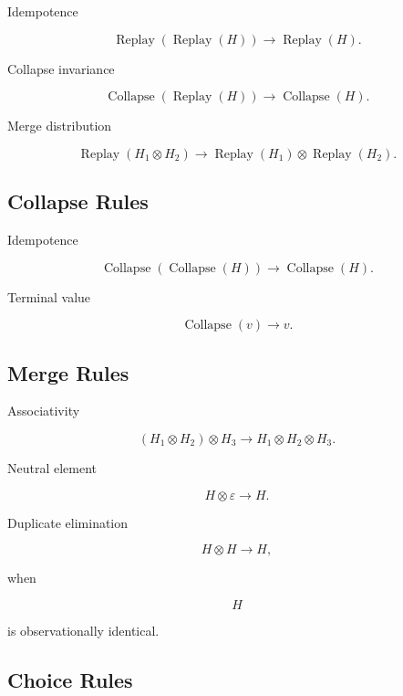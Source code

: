 \documentclass[12pt,oneside]{article}
\theoremstyle{definition}
\theoremstyle{remark}
\begin{document}
Idempotence

\[
\operatorname{Replay}
(
\operatorname{Replay}(H)
)
\rightarrow
\operatorname{Replay}(H).
\]

Collapse invariance

\[
\operatorname{Collapse}
(
\operatorname{Replay}(H)
)
\rightarrow
\operatorname{Collapse}(H).
\]

Merge distribution

\[
\operatorname{Replay}
(H_1\otimes H_2)
\rightarrow
\operatorname{Replay}(H_1)
\otimes
\operatorname{Replay}(H_2).
\]

\subsection*{Collapse Rules}

Idempotence

\[
\operatorname{Collapse}
(
\operatorname{Collapse}(H)
)
\rightarrow
\operatorname{Collapse}(H).
\]

Terminal value

\[
\operatorname{Collapse}(v)
\rightarrow
v.
\]

\subsection*{Merge Rules}

Associativity

\[
(H_1\otimes H_2)\otimes H_3
\rightarrow
H_1\otimes H_2\otimes H_3.
\]

Neutral element

\[
H\otimes\varepsilon
\rightarrow
H.
\]

Duplicate elimination

\[
H\otimes H
\rightarrow
H,
\]

when

\[
H
\]

is observationally identical.

\subsection*{Choice Rules}
\end{document}
